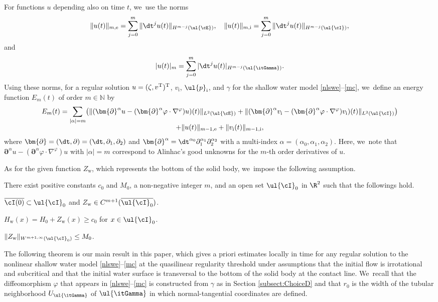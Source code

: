 For functions $u$ depending also on time $t$, we~use the norms
\[
\|u(t)\|_{m,{\rm e}}=\sum_{j=0}^m \|\dt^j u (t)\|_{H^{m-j}(\ul{\cE})}, \quad
\|u(t)\|_{m,{\rm i}}=\sum_{j=0}^m \|\dt^j u (t)\|_{H^{m-j}(\ul{\cI})},
\]
and
\[
|u(t)|_m = \sum_{j=0}^m |\dt^j u(t)|_{H^{m-j}(\ul{\itGamma})}.
\]
Using these norms, for a regular solution $u=(\zeta,v^{\rm T})^{\rm T}$, $v_\mathrm{i}$, $\ul{p}_\mathrm{i}$, and $\gamma$ for the shallow water model
\eqref{nlswe}--\eqref{mc}, we~define an energy function $E_m(t)$ of order $m\in\mathbb{N}$ by
\begin{multline*}
E_m(t)
= \sum_{|\alpha|=m} \bigl(\|(\bm{\partial}^\alpha u-(\bm{\partial}^\alpha\varphi\cdot\nabla^\varphi)u)(t)\|_{L^2(\ul{\cE})}
+ \|(\bm{\partial}^\alpha v_\mathrm{i}-(\bm{\partial}^\alpha\varphi\cdot\nabla^\varphi)v_\mathrm{i})(t)\|_{L^2(\ul{\cI})} \bigr) \\[-5pt]
+ \|u(t)\|_{m-1,{\rm e}} + \|v_\mathrm{i}(t)\|_{m-1,{\rm i}},
\end{multline*}
where $\bm{\partial}=(\dt,\partial)=(\dt,\partial_1,\partial_2)$ and $\bm{\partial}^\alpha=\dt^{\alpha_0}\partial_1^{\alpha_1}\partial_2^{\alpha_2}$
with a multi-index $\alpha=(\alpha_0,\alpha_1,\alpha_2)$.
Here, we~note that $\bm{\partial}^\alpha u-(\bm{\partial}^\alpha\varphi\cdot\nabla^\varphi)u$ with $|\alpha|=m$ correspond to Alinhac's good unknowns
for the $m$-th order derivatives of $u$.

As for the given function $Z_\mathrm{w}$, which represents the bottom of the solid body, we~impose the following assumption.

\begin{assumption}\label{ass:BSB}
There exist positive constants $c_0$ and $M_0$, a non-negative integer $m$, and an open set $\ul{\cI}_{0}$ in $\R^2$ such that the followings hold.
\begin{enumeratei}
\item\label{ass:BSBi}
$\overline{\cI(0)}\subset\ul{\cI}_{0}$ and $Z_\mathrm{w} \in C^{m+1}(\overline{\ul{\cI}_0})$.
\item\label{ass:BSBii}
$H_\mathrm{w}(x)=H_0+Z_\mathrm{w}(x) \geq c_0$ for $x\in\ul{\cI}_0$.
\item\label{ass:BSBiii}
$\|Z_\mathrm{w}\|_{W^{m+1,\infty}(\ul{\cI}_0)} \leq M_0$.
\end{enumeratei}
\end{assumption}

The following theorem is our main result in this paper, which gives a priori estimates locally in time for any regular solution to the nonlinear shallow water model
\eqref{nlswe}--\eqref{mc} at the quasilinear regularity threshold under assumptions that the initial flow is irrotational and subcritical
and that the initial water surface is transversal to the bottom of the solid body at the contact line. We~recall that the diffeomorphism $\varphi$ that appears in \eqref{nlswe}--\eqref{mc} is constructed from $\gamma$ as in Section \ref{subsect:ChoiceD}
and that $r_0$ is the width of the tubular neighborhood $U_{\ul{\itGamma}}$ of $\ul{\itGamma}$ in which normal-tangential coordinates are defined.


